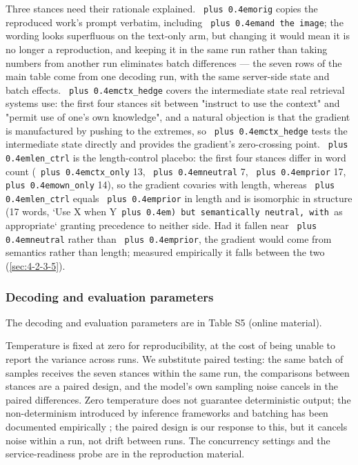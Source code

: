 \documentclass[pdflatex,sn-basic,Numbered]{sn-jnl}
\theoremstyle{thmstyleone}
\theoremstyle{thmstyletwo}
\theoremstyle{thmstylethree}
\DeclareRobustCommand{\code}[1]{\texttt{\spaceskip=0pt plus 0.4em\relax#1}}
\begin{document}
Three stances need their rationale explained. \code{orig} copies the reproduced work's prompt
verbatim, including \code{and the image}; the wording looks superfluous on the text-only arm, but
changing it would mean it is no longer a reproduction, and keeping it in the same run rather
than taking numbers from another run eliminates batch differences — the seven rows of the main
table come from one decoding run, with the same server-side state and batch effects.
\code{ctx\_hedge} covers the intermediate state real retrieval systems use: the first four stances
sit between "instruct to use the context" and "permit use of one's own knowledge", and a
natural objection is that the gradient is manufactured by pushing to the extremes, so
\code{ctx\_hedge} tests the intermediate state directly and provides the gradient's zero-crossing
point. \code{len\_ctrl} is the length-control placebo: the first four stances differ in word count
(\code{ctx\_only} 13, \code{neutral} 7, \code{prior} 17, \code{own\_only} 14), so the gradient covaries with length,
whereas \code{len\_ctrl} equals \code{prior} in length and is isomorphic in structure (17 words, `Use X
when Y\code{) but semantically neutral, with }as appropriate` granting precedence to neither side.
Had it fallen near \code{neutral} rather than \code{prior}, the gradient would come from semantics rather
than length; measured empirically it falls between the two (\ref{sec:4-2-3-5}).

\subsubsection{Decoding and evaluation parameters}
\label{sec:4-3-3}

The decoding and evaluation parameters are in Table S5 (online material).

Temperature is fixed at zero for reproducibility, at the cost of being unable to report the
variance across runs. We substitute paired testing: the same batch of samples receives the seven
stances within the same run, the comparisons between stances are a paired design, and the
model's own sampling noise cancels in the paired differences.
Zero temperature does not guarantee deterministic output; the non-determinism introduced by
inference frameworks and batching has been documented empirically \cite{ref41,ref42}; the paired design is
our response to this, but it cancels noise within a run, not drift between runs. The concurrency
settings and the service-readiness probe are in the reproduction material.
\end{document}
